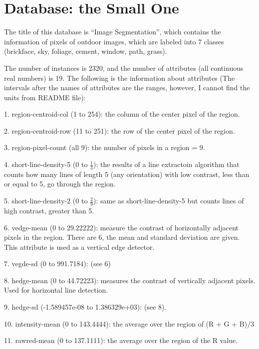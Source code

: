 \documentclass{article}
\begin{document}
\goodbreak

\section{Database: the Small One}

The title of this database is ``Image Segmentation'', which contains the information of pixels of outdoor images, which are labeled into 7 
classes (brickface, sky, foliage, cement, window, path, grass).

The number of instances is 2320, and the number of attributes (all continuous real numbers) is 19. The following is the information about 
attributes (The intervals after the names of attributes are the ranges, however, I cannot find the units from README file):
    
    1.  region-centroid-col (1 to 254):  the column of the center pixel of the region.
    
    2.  region-centroid-row (11 to 251):  the row of the center pixel of the region.
    
    3.  region-pixel-count (all 9):  the number of pixels in a region = 9.
    
    4.  short-line-density-5 (0 to $\frac{1}{3}$):  the results of a line extractoin algorithm that counts how many lines of length 5 (any orientation) with
        low contrast, less than or equal to 5, go through the region.
        
    5.  short-line-density-2 (0 to $\frac{2}{9}$):  same as short-line-density-5 but counts lines of high contrast, greater than 5.
    
    6.  vedge-mean (0 to 29.22222):  measure the contrast of horizontally adjacent pixels in the region.  There are 6, the mean and standard deviation are given.  
        This attribute is used as a vertical edge detector.
        
    7.  vegde-sd (0 to 991.7184):  (see 6)
    
    8.  hedge-mean (0 to 44.72223):  measures the contrast of vertically adjacent pixels. Used for horizontal line detection. 
    
    9.  hedge-sd (-1.589457e-08 to 1.386329e+03): (see 8).
    
    10. intensity-mean (0 to 143.4444):  the average over the region of (R + G + B)/3
    
    11. rawred-mean (0 to 137.1111): the average over the region of the R value.
    
\end{document}
